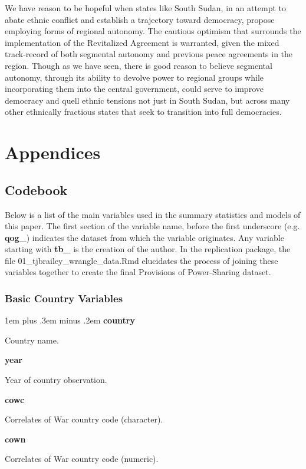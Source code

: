 \documentclass[12pt]{article}
\begin{document}
We have reason to be hopeful when states like South Sudan, in an attempt to abate ethnic conflict and establish a trajectory toward democracy, propose employing forms of regional autonomy. The cautious optimism that surrounds the implementation of the Revitalized Agreement is warranted, given the mixed track-record of both segmental autonomy and previous peace agreements in the region. Though as we have seen, there is good reason to believe segmental autonomy, through its ability to devolve power to regional groups while incorporating them into the central government, could serve to improve democracy and quell ethnic tensions not just in South Sudan, but across many other ethnically fractious states that seek to transition into full democracies.

\pagebreak

\printbibliography

\pagebreak

\section{Appendices}
\subsection{Codebook}

Below is a list of the main variables used in the summary statistics and models of this paper. The first section of the variable name, before the first underscore (e.g. \textbf{qog\_}) indicates the dataset from which the variable originates. Any variable starting with \textbf{tb\_} is the creation of the author. In the replication package, the file 01\_tjbrailey\_wrangle\_data.Rmd elucidates the process of joining these variables together to create the final Provisions of Power-Sharing dataset.  

\newlength\cbl
\newenvironment{codebook}[1][rob\_avprison1]{
	\settowidth{\cbl}{#1}
	\parskip1em plus .3em minus .2em
	\parindent0pt
	\def\code##1##2{{\bfseries ##1}\hfill
		\parbox[t]{\dimexpr\linewidth-15em-\cbl}{##2}\par}}{\noindent}

\singlespacing

\subsubsection{Basic Country Variables}
	
\begin{codebook}
	\code{country}{Country name.}
	\code{year}{Year of country observation.}
	\code{cowc}{Correlates of War country code (character).}
	\code{cown}{Correlates of War country code (numeric).}
\end{codebook}
\end{document}
